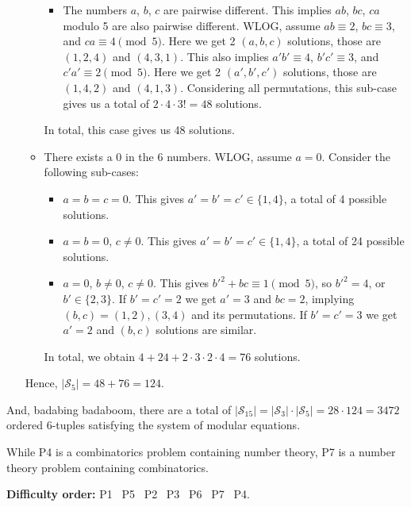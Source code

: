 \documentclass[11pt]{article}
\begin{document}
\begin{solution}
\begin{enumerate}
\begin{itemize}
\begin{itemize}
                        \item The numbers \(a\), \(b\), \(c\) are pairwise different. This implies \(ab\), \(bc\), \(ca\) modulo 5 are also pairwise different. WLOG, assume \(ab \equiv 2\), \(bc \equiv 3\), and \(ca \equiv 4 \pmod{5}\). Here we get 2 \((a,b,c)\) solutions, those are \((1,2,4)\) and \((4,3,1)\). This also implies \(a'b' \equiv 4\), \(b'c' \equiv 3\), and \(c'a' \equiv 2 \pmod5\). Here we get 2 \((a',b',c')\) solutions, those are \((1,4,2)\) and \((4,1,3)\). Considering all permutations, this sub-case gives us a total of \(2 \cdot 4 \cdot 3! = 48\) solutions.
                    \end{itemize}

                    In total, this case gives us 48 solutions.

                    \item There exists a 0 in the 6 numbers. WLOG, assume \(a = 0\). Consider the following sub-cases:

                    \begin{itemize}
                        \item \(a = b = c = 0\). This gives \(a' = b' = c' \in \{1,4\}\), a total of 4 possible solutions.
                        \item \(a = b = 0\), \(c \neq 0\). This gives \(a' = b' = c' \in \{1,4\}\), a total of 24 possible solutions.
                        \item \(a = 0\), \(b \neq 0\), \(c \neq 0\). This gives \(b'^2 + bc \equiv 1 \pmod5\), so \(b'^2 = 4\), or \(b' \in \{2,3\}\). If \(b' = c' = 2\) we get \(a' = 3\) and \(bc = 2\), implying \((b,c) = (1,2), (3,4)\) and its permutations. If \(b' = c' = 3\) we get \(a' = 2\) and \((b,c)\) solutions are similar.
                    \end{itemize}

                    In total, we obtain \(4 + 24 + 2 \cdot 3 \cdot 2 \cdot 4 = 76\) solutions.
                \end{itemize}

                Hence, \(\left|\mathcal{S}_{5}\right| = 48 + 76 = 124\).
            \end{enumerate}

            And, badabing badaboom, there are a total of \(\left|\mathcal{S}_{15}\right| = \left|\mathcal{S}_{3}\right| \cdot\left|\mathcal{S}_{5}\right| = 28 \cdot 124 = 3472\) ordered 6-tuples satisfying the system of modular equations.
        \end{solution}

        \begin{remark}
            While P4 is a combinatorics problem containing number theory, P7 is a number theory problem containing combinatorics.
        \end{remark}

        \textbf{Difficulty order:} P1 \textrightarrow \ P5 \textrightarrow \ P2 \textrightarrow \ P3 \textrightarrow \ P6 \textrightarrow \ P7 \textrightarrow \ P4.
\end{document}
